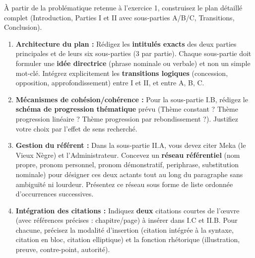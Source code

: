 \documentclass[11pt]{article}
\begin{document}
\begin{exercice}
À partir de la problématique retenue à l'exercice 1, construisez le plan détaillé complet (Introduction, Parties I et II avec sous-parties A/B/C, Transitions, Conclusion).

\begin{enumerate}
    \item \textbf{Architecture du plan :} Rédigez les \textbf{intitulés exacts} des deux parties principales et de leurs six sous-parties (3 par partie). Chaque sous-partie doit formuler une \textbf{idée directrice} (phrase nominale ou verbale) et non un simple mot-clé. Intégrez explicitement les \textbf{transitions logiques} (concession, opposition, approfondissement) entre I et II, et entre A, B, C.
    \item \textbf{Mécanismes de cohésion/cohérence :} Pour la sous-partie I.B, rédigez le \textbf{schéma de progression thématique} prévu (Thème constant ? Thème progression linéaire ? Thème progression par rebondissement ?). Justifiez votre choix par l'effet de sens recherché.
    \item \textbf{Gestion du référent :} Dans la sous-partie II.A, vous devez citer Meka (le Vieux Nègre) et l'Administrateur. Concevez un \textbf{réseau référentiel} (nom propre, pronom personnel, pronom démonstratif, periphrase, substitution nominale) pour désigner ces deux actants tout au long du paragraphe sans ambiguïté ni lourdeur. Présentez ce réseau sous forme de liste ordonnée d'occurrences successives.
    \item \textbf{Intégration des citations :} Indiquez \textbf{deux} citations courtes de l'œuvre (avec références précises : chapitre/page) à insérer dans I.C et II.B. Pour chacune, précisez la modalité d'insertion (citation intégrée à la syntaxe, citation en bloc, citation elliptique) et la fonction rhétorique (illustration, preuve, contre-point, autorité).
\end{enumerate}
\end{exercice}
\end{document}

